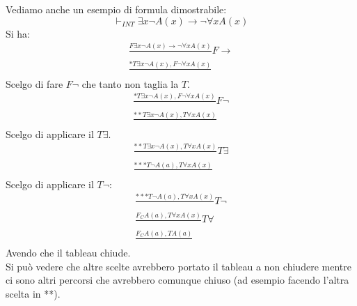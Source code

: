 \documentclass[a4paper,12pt, oneside]{book}
\begin{document}
\begin{esempio}
  Vediamo anche un esempio di formula dimostrabile:
  \[\vdash_{INT}\exists x \neg A(x)\to \neg\forall xA(x)\]
  Si ha:
  \begin{gather*}
    \frac{F\exists x \neg A(x)\to \neg\forall xA(x)}{}F\to\\
    \frac{*T\exists x\neg A(x),F\neg\forall x A(x)}{}
  \end{gather*}
  Scelgo di fare $F\neg$ che tanto non taglia la $T$.
  \begin{gather*}
    \frac{*T\exists x\neg A(x),F\neg\forall x A(x)}{}F\neg\\
    \frac{**T\exists x\neg A(x), T\forall x A(x)}{}
  \end{gather*}
  Scelgo di applicare il $T\exists$.
  \begin{gather*}
    \frac{**T\exists x\neg A(x), T\forall x A(x)}{}T\exists\\
    \frac{***T\neg A(a),T\forall xA(x)}{}
  \end{gather*}
  Scelgo di applicare il $T\neg$:
  \begin{gather*}
    \frac{***T\neg A(a),T\forall xA(x)}{}T\neg\\
    \frac{F_C A(a),T\forall xA(x)}{}T\forall\\
    \frac{F_C A(a), TA(a)}{}
  \end{gather*}
  Avendo che il tableau chiude.\\
  Si può vedere che altre scelte avrebbero portato il tableau a non chiudere
  mentre ci sono altri percorsi che avrebbero comunque chiuso (ad esempio
  facendo l'altra scelta in **).
\end{esempio}
\end{document}
